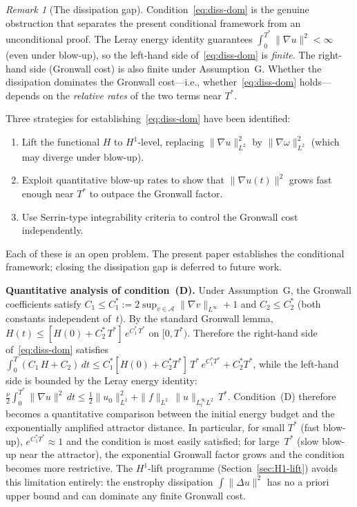 \documentclass[12pt,a4paper]{article}
\theoremstyle{definition}
\theoremstyle{plain}
\theoremstyle{remark}
\newtheorem{remark}[definition]{Remark}
\begin{document}
\begin{remark}[The dissipation gap]\label{rem:diss-gap}
Condition~\eqref{eq:diss-dom} is the genuine obstruction that
separates the present conditional framework from an unconditional
proof.  The Leray energy identity guarantees
$\int_0^{T^*}\|\nabla u\|^2 < \infty$ (even under blow-up), so
the left-hand side of~\eqref{eq:diss-dom} is \emph{finite}.
The right-hand side (Gronwall cost) is also finite under
Assumption~G.  Whether the dissipation dominates the Gronwall
cost---i.e., whether~\eqref{eq:diss-dom} holds---depends on
the \emph{relative rates} of the two terms near $T^*$.

Three strategies for establishing~\eqref{eq:diss-dom} have been
identified:
\begin{enumerate}
  \item[\textup{(i)}]  Lift the functional $H$ to $H^1$-level,
    replacing $\|\nabla u\|_{L^2}^2$ by $\|\nabla\omega\|_{L^2}^2$
    (which may diverge under blow-up).
  \item[\textup{(ii)}]  Exploit quantitative blow-up rates to
    show that $\|\nabla u(t)\|^2$ grows fast enough near $T^*$
    to outpace the Gronwall factor.
  \item[\textup{(iii)}]  Use Serrin-type integrability criteria
    to control the Gronwall cost independently.
\end{enumerate}
Each of these is an open problem.  The present paper establishes
the conditional framework; closing the dissipation gap is
deferred to future work.

\medskip\noindent
\textbf{Quantitative analysis of condition~(D).}\;
Under Assumption~G, the Gronwall coefficients satisfy
$C_1 \le C_1^* := 2\sup_{v\in\mathcal{A}}\|\nabla v\|_{L^\infty}+1$
and $C_2 \le C_2^*$ (both constants independent of~$t$).
By the standard Gronwall lemma,
$H(t) \le [H(0)+C_2^*\,T^*]\,e^{C_1^*\,T^*}$
on $[0,T^*)$.  Therefore the right-hand side
of~\eqref{eq:diss-dom} satisfies
$\int_0^T(C_1\,H+C_2)\,dt
\le C_1^*[H(0)+C_2^*T^*]\,T^*\,e^{C_1^*T^*} + C_2^*T^*$,
while the left-hand side is bounded by the Leray energy identity:
$\frac{\nu}{2}\int_0^{T^*}\|\nabla u\|^2\,dt
\le \frac{1}{2}\|u_0\|^2_{L^2}
+ \|f\|_{L^2}\,\|u\|_{L^\infty_tL^2}\,T^*$.
Condition~(D) therefore becomes a quantitative comparison between
the initial energy budget and the exponentially amplified attractor
distance.  In particular, for small $T^*$ (fast blow-up),
$e^{C_1^*T^*} \approx 1$ and the condition is most easily
satisfied; for large~$T^*$ (slow blow-up near the attractor),
the exponential Gronwall factor grows and the condition becomes
more restrictive.  The $H^1$-lift programme
(Section~\ref{sec:H1-lift}) avoids this limitation entirely:
the enstrophy dissipation $\int\|\Delta u\|^2$ has
no a priori upper bound and can dominate any finite Gronwall cost.
\end{remark}
\end{document}
